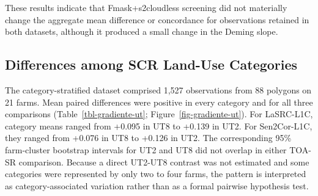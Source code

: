 \documentclass[remotesensing,article,submit,pdftex,oneauthor]{Definitions/mdpi}
\begin{document}
These results indicate that Fmask+s2cloudless screening did not
materially change the aggregate mean difference or concordance for
observations retained in both datasets, although it produced a small
change in the Deming slope.

\subsection{Differences among SCR Land-Use
Categories}\label{sec-gradiente-ut}

The category-stratified dataset comprised 1,527 observations from 88
polygons on 21 farms. Mean paired differences were positive in every
category and for all three comparisons (Table~\ref{tbl-gradiente-ut};
Figure~\ref{fig-gradiente-ut}). For LaSRC-L1C, category means ranged
from +0.095 in UT8 to +0.139 in UT2. For Sen2Cor-L1C, they ranged from
+0.076 in UT8 to +0.126 in UT2. The corresponding 95\% farm-cluster
bootstrap intervals for UT2 and UT8 did not overlap in either TOA-SR
comparison. Because a direct UT2-UT8 contrast was not estimated and some
categories were represented by only two to four farms, the pattern is
interpreted as category-associated variation rather than as a formal
pairwise hypothesis test.
\end{document}
